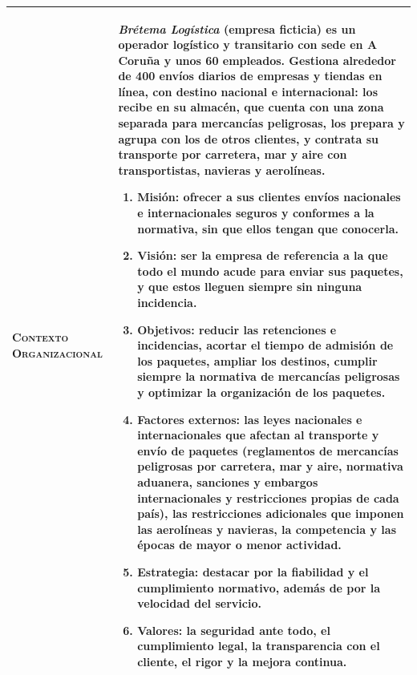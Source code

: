 \documentclass[12pt,a4paper,twoside,spanish]{article}      %
\begin{document}
{\begin{longtable}{|p{2.8cm}|p{12.6cm}|}
\textsc{Contexto Organizacional} &
\textit{Brétema Logística} (empresa ficticia) es un operador logístico y transitario con sede en A Coruña y unos 60 empleados. Gestiona alrededor de 400 envíos diarios de empresas y tiendas en línea, con destino nacional e internacional: los recibe en su almacén, que cuenta con una zona separada para mercancías peligrosas, los prepara y agrupa con los de otros clientes, y contrata su transporte por carretera, mar y aire con transportistas, navieras y aerolíneas.
\begin{enumerate}
    \item \textbf{Misión:} ofrecer a sus clientes envíos nacionales e internacionales seguros y conformes a la normativa, sin que ellos tengan que conocerla.
    \item \textbf{Visión:} ser la empresa de referencia a la que todo el mundo acude para enviar sus paquetes, y que estos lleguen siempre sin ninguna incidencia.
    \item \textbf{Objetivos:} reducir las retenciones e incidencias, acortar el tiempo de admisión de los paquetes, ampliar los destinos, cumplir siempre la normativa de mercancías peligrosas y optimizar la organización de los paquetes.
    \item \textbf{Factores externos:} las leyes nacionales e internacionales que afectan al transporte y envío de paquetes (reglamentos de mercancías peligrosas por carretera, mar y aire, normativa aduanera, sanciones y embargos internacionales y restricciones propias de cada país), las restricciones adicionales que imponen las aerolíneas y navieras, la competencia y las épocas de mayor o menor actividad.
    \item \textbf{Estrategia:} destacar por la fiabilidad y el cumplimiento normativo, además de por la velocidad del servicio.
    \item \textbf{Valores:} la seguridad ante todo, el cumplimiento legal, la transparencia con el cliente, el rigor y la mejora continua.
\end{enumerate} \\ \hline


\end{longtable}}
\end{document}
